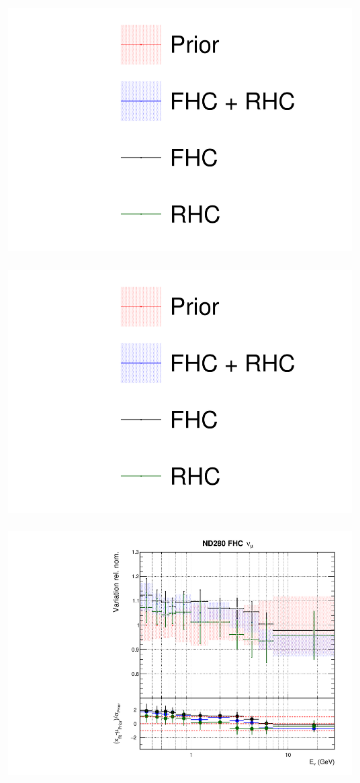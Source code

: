 \begin{figure}
\centering
\begin{subfigure}{0.3\textwidth}
  \centering
  \includegraphics[width=1.0\linewidth, trim={5mm  90mm 0mm 0mm}, clip]{figs/fhcrhcfits_leg}
\end{subfigure}
\begin{subfigure}{0.3\textwidth}
  \centering
  \includegraphics[width=1.0\linewidth, trim={5mm  0mm 0mm 95mm}, clip]{figs/fhcrhcfits_leg}
\end{subfigure}
\begin{subfigure}{0.45\textwidth}
  \centering
  \includegraphics[width=0.75\linewidth]{figs/fhcrhcfitsflux_0}

\end{subfigure}
\end{figure}
